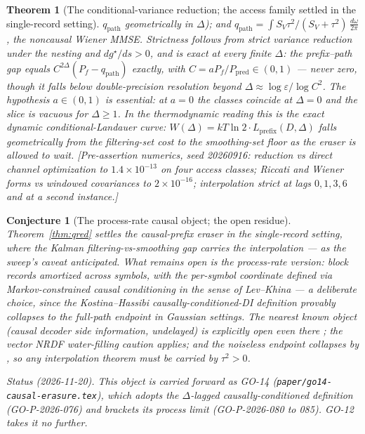 ﻿\documentclass[11pt]{article}
\newtheorem{conjecture}{Conjecture}
\newtheorem{theorem}{Theorem}
\theoremstyle{remark}
\begin{document}
\begin{theorem}[The conditional-variance reduction; the access family
settled in the single-record setting]
$q_{\mathrm{path}}$ geometrically in $\Delta$); and $q_{\mathrm{path}}
=\int S_V\tau^2/(S_V+\tau^2)\,\tfrac{d\omega}{2\pi}$, the noncausal
Wiener MMSE. Strictness follows from strict variance reduction under
the nesting and $dg^\star\!/ds>0$, and is exact at every finite
$\Delta$: the prefix--path gap equals
$C^{2\Delta}(P_f-q_{\mathrm{path}})$ exactly, with
$C=aP_f/P_{\mathrm{pred}}\in(0,1)$ --- never zero, though it falls
below double-precision resolution beyond
$\Delta\approx\log\varepsilon/\log C^2$. The hypothesis $a\in(0,1)$ is
essential: at $a=0$ the classes coincide at $\Delta=0$ and the
slice is vacuous for $\Delta\ge1$. In the thermodynamic reading this
is the exact dynamic conditional-Landauer curve: $W(\Delta)=kT\ln2\cdot
L_{\mathrm{prefix}}(D,\Delta)$ falls geometrically from the
filtering-set cost to the smoothing-set floor as the eraser is allowed
to wait. [Pre-assertion numerics, seed 20260916: reduction vs direct
channel optimization to $1.4\times10^{-13}$ on four access classes;
Riccati and Wiener forms vs windowed covariances to
$2\times10^{-16}$; interpolation strict at lags $0,1,3,6$ and at a
second instance.]
\end{theorem}

\begin{conjecture}[The process-rate causal object; the open residue]
\label{conj:causal}
Theorem~\ref{thm:qred} settles the causal-prefix eraser in the
\emph{single-record} setting, where the Kalman filtering-vs-smoothing
gap carries the interpolation --- as the sweep's caveat
anticipated. What remains open is the \emph{process-rate} version:
block records amortized across symbols, with the per-symbol coordinate
defined via Markov-constrained causal conditioning in the sense of
Lev--Khina \cite{levkhina} --- a deliberate choice, since the
Kostina--Hassibi causally-conditioned-DI definition \cite{kostina}
provably collapses to the full-path endpoint in Gaussian settings. The
nearest known object (causal decoder side information, undelayed) is
explicitly open even there \cite{levkhina}; the vector NRDF
water-filling caution \cite{stavrou} applies; and the noiseless
endpoint collapses by \cite[Lemma~1]{suncyr}, so any interpolation
theorem must be carried by $\tau^2>0$.

\emph{Status (2026-11-20).} This object is carried forward as GO-14
(\texttt{paper/go14-causal-erasure.tex}), which adopts the
$\Delta$-lagged causally-conditioned definition (GO-P-2026-076) and
brackets its process limit (GO-P-2026-080 to 085). GO-12 takes it no
further.
\end{conjecture}
\end{document}
